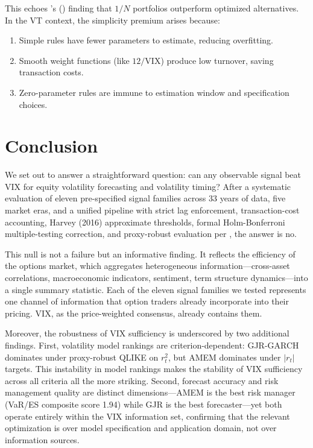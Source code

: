\documentclass[12pt,a4paper]{article}
\begin{document}
This echoes \citeauthor{demiguel2009}'s (\citeyear{demiguel2009}) finding that $1/N$ portfolios outperform optimized alternatives. In the VT context, the simplicity premium arises because:
\begin{enumerate}
    \item Simple rules have fewer parameters to estimate, reducing overfitting.
    \item Smooth weight functions (like $12/\text{VIX}$) produce low turnover, saving transaction costs.
    \item Zero-parameter rules are immune to estimation window and specification choices.
\end{enumerate}


\section{Conclusion}
\label{sec:conclusion}

We set out to answer a straightforward question: can any observable signal beat VIX for equity volatility forecasting and volatility timing? After a systematic evaluation of eleven pre-specified signal families across 33 years of data, five market eras, and a unified pipeline with strict lag enforcement, transaction-cost accounting, Harvey (2016) approximate thresholds, formal Holm-Bonferroni multiple-testing correction, and proxy-robust evaluation per \citet{patton2011}, the answer is no.

This null is not a failure but an informative finding. It reflects the efficiency of the options market, which aggregates heterogeneous information---cross-asset correlations, macroeconomic indicators, sentiment, term structure dynamics---into a single summary statistic. Each of the eleven signal families we tested represents one channel of information that option traders already incorporate into their pricing. VIX, as the price-weighted consensus, already contains them.

Moreover, the robustness of VIX sufficiency is underscored by two additional findings. First, volatility model rankings are criterion-dependent: GJR-GARCH dominates under proxy-robust QLIKE on $r_t^2$, but AMEM dominates under $|r_t|$ targets. This instability in model rankings makes the stability of VIX sufficiency across all criteria all the more striking. Second, forecast accuracy and risk management quality are distinct dimensions---AMEM is the best risk manager (VaR/ES composite score 1.94) while GJR is the best forecaster---yet both operate entirely within the VIX information set, confirming that the relevant optimization is over model specification and application domain, not over information sources.
\end{document}
